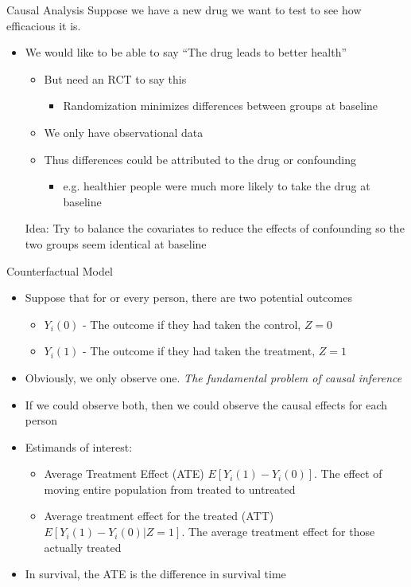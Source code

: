 \begin{frame}{Causal Analysis}
Suppose we have a new drug we want to test to see how efficacious it is.
 \begin{itemize}
  \item We would like to be able to say ``The drug leads to better health''
  \begin{itemize}
   \item But need an RCT to say this
   \begin{itemize}
    \item Randomization minimizes differences between groups at baseline
   \end{itemize}

   \item We only have observational data
   \item Thus differences could be attributed to the drug or confounding
   
   \begin{itemize}
    \item e.g. healthier people were much more likely to take the drug at baseline
   \end{itemize}

  \end{itemize}
Idea: Try to balance the covariates to reduce the effects of confounding
so the two groups seem identical at baseline
 \end{itemize}

\end{frame}

\begin{frame}{Counterfactual Model}
\begin{itemize}
 \item Suppose that for or every person, there are two potential outcomes
 \begin{itemize}
  \item $Y_i(0)$ - The outcome if they had taken the control, $Z=0$
  \item $Y_i(1)$ - The outcome if they had taken the treatment, $Z=1$
 \end{itemize}
\item Obviously, we only observe one. \textit{The fundamental problem of causal inference}
\item If we could observe both, then we could observe the causal effects for each person
\item Estimands of interest:
\begin{itemize}
 \item Average Treatment Effect (ATE) $E[Y_i(1)-Y_i(0)]$. The effect of moving entire population
 from treated to untreated
 \item Average treatment effect for the treated (ATT) $E[Y_i(1)-Y_i(0)|Z=1]$. The average treatment
 effect for those actually treated
\end{itemize}
\item In survival, the ATE is the difference in survival time
\end{itemize}
 
\end{frame}

